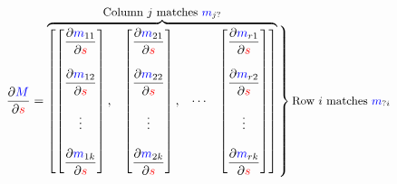        \begin{equation}
            \pderiv{ \blu{M} }{ \red{s} } 
            =
            \overbrace{
                \begin{bmatrix}
                    \begin{bmatrix}
                        \bigpderiv{ \blu{m}_{11} }   { \red{s} }\\ 
                        \\
                        \bigpderiv{ \blu{m}_{12} }   { \red{s} }\\ 
                        \\
                        \vdots \\ 
                        \\
                        \bigpderiv{ \blu{m}_{1k} }   { \red{s} }
                    \end{bmatrix}, &
                    \begin{bmatrix}
                        \bigpderiv{ \blu{m}_{21} }   { \red{s} }\\ 
                        \\
                        \bigpderiv{ \blu{m}_{22} }   { \red{s} }\\ 
                        \\
                        \vdots \\ 
                        \\
                        \bigpderiv{ \blu{m}_{2k} }   { \red{s} }
                    \end{bmatrix}, &
                    \cdots &
                    \begin{bmatrix}
                        \bigpderiv{ \blu{m}_{r1} }   { \red{s} }\\ 
                        \\
                        \bigpderiv{ \blu{m}_{r2} }   { \red{s} }\\ 
                        \\
                        \vdots \\ 
                        \\
                        \bigpderiv{ \blu{m}_{rk} }   { \red{s} }
                    \end{bmatrix}
                \end{bmatrix}
            }^{ \text{\small Column $j$ matches $\blu{m}_{j?}$} }
            \bigggrB{125pt} \text{\small Row $i$ matches $\blu{m}_{?i}$} 
        \end{equation}
        
